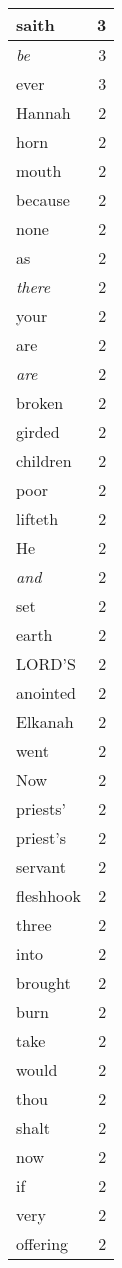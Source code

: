 \begin{center}
\begin{longtable}{l|r}
saith & 3 \\ \hline
\emph{be} & 3 \\ \hline
ever & 3 \\ \hline
Hannah & 2 \\ \hline
horn & 2 \\ \hline
mouth & 2 \\ \hline
because & 2 \\ \hline
none & 2 \\ \hline
as & 2 \\ \hline
\emph{there} & 2 \\ \hline
your & 2 \\ \hline
are & 2 \\ \hline
\emph{are} & 2 \\ \hline
broken & 2 \\ \hline
girded & 2 \\ \hline
children & 2 \\ \hline
poor & 2 \\ \hline
lifteth & 2 \\ \hline
He & 2 \\ \hline
\emph{and} & 2 \\ \hline
set & 2 \\ \hline
earth & 2 \\ \hline
LORD'S & 2 \\ \hline
anointed & 2 \\ \hline
Elkanah & 2 \\ \hline
went & 2 \\ \hline
Now & 2 \\ \hline
priests' & 2 \\ \hline
priest's & 2 \\ \hline
servant & 2 \\ \hline
fleshhook & 2 \\ \hline
three & 2 \\ \hline
into & 2 \\ \hline
brought & 2 \\ \hline
burn & 2 \\ \hline
take & 2 \\ \hline
would & 2 \\ \hline
thou & 2 \\ \hline
shalt & 2 \\ \hline
now & 2 \\ \hline
if & 2 \\ \hline
very & 2 \\ \hline
offering & 2 \\ \hline

\end{longtable}
\end{center}
